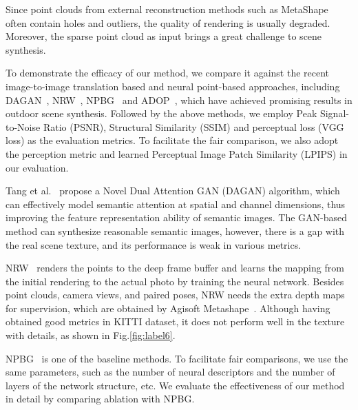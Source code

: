 \documentclass[sigconf]{acmart}
\begin{document}
Since point clouds from external reconstruction methods such as MetaShape~\cite{Metashape} often contain holes and outliers, the quality of rendering is usually degraded. Moreover, the sparse point cloud as input brings a great challenge to scene synthesis.

To demonstrate the efficacy of our method, we compare it against the recent image-to-image translation based and neural point-based approaches, including DAGAN~\cite{tang2020dual}, NRW~\cite{meshry2019neural}, NPBG~\cite{aliev2020neural} and ADOP~\cite{ruckert2021adop}, which have achieved promising results in outdoor scene synthesis. Followed by the above methods, we employ Peak Signal-to-Noise Ratio (PSNR), Structural Similarity (SSIM) and perceptual loss (VGG loss) as the evaluation metrics. To facilitate the fair comparison, we also adopt the perception metric and learned Perceptual Image Patch Similarity (LPIPS) in our evaluation.













Tang et al.~\cite{tang2020dual} propose a Novel Dual Attention GAN (DAGAN) algorithm, which can effectively model semantic attention at spatial and channel dimensions, thus improving the feature representation ability of semantic images. The GAN-based method can synthesize reasonable semantic images, however, there is a gap with the real scene texture, and its performance is weak in various metrics.

NRW~\cite{meshry2019neural} renders the points to the deep frame buffer and learns the mapping from the initial rendering to the actual photo by training the neural network. Besides point clouds, camera views, and paired poses, NRW needs the extra depth maps for supervision, which are obtained by Agisoft Metashape~\cite{Metashape}. Although having obtained good metrics in KITTI dataset, it does not perform well in the texture with details, as shown in Fig.\ref{fig:label6}. 




NPBG~\cite{aliev2020neural} is one of the baseline methods. To facilitate fair comparisons, we use the same parameters, such as the number of neural descriptors and the number of layers of the network structure, etc. We evaluate the effectiveness of our method in detail by comparing ablation with NPBG.
\end{document}
